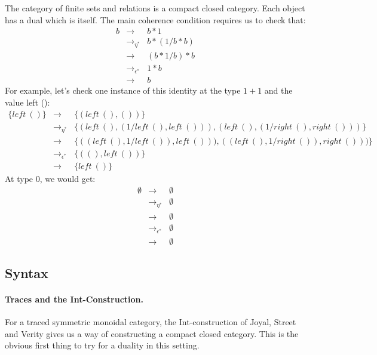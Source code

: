 \documentclass[preprint]{sigplanconf}
\begin{document}
The category of finite sets and relations is a compact closed category. Each
object has a dual which is itself. The main coherence condition requires us
to check that:
\[\begin{array}{rcl}
b &\rightarrow& b * 1 \\
  &\rightarrow_{\eta^*}& b * (1/b * b) \\
  &\rightarrow& (b * 1/b) * b \\
  &\rightarrow_{\epsilon^*}& 1 * b \\
  &\rightarrow& b
\end{array}\]
For example, let's check one instance of this identity at the type $1+1$ and
the value {{left ()}}:
\[\begin{array}{rcl}
\{ \mathit{left}~() \} &\rightarrow& \{ (\mathit{left}~(), ()) \} \\
  &\rightarrow_{\eta^*}& \{ (\mathit{left}~(),(1/\mathit{left}~(),\mathit{left}~())), 
                            (\mathit{left}~(),(1/\mathit{right}~(),\mathit{right}~())) \} \\
  &\rightarrow& \{ ((\mathit{left}~(),1/\mathit{left}~()),\mathit{left}~())), 
                   ((\mathit{left}~(),1/\mathit{right}~()),\mathit{right}~())) \} \\
  &\rightarrow_{\epsilon^*}& \{ ((),\mathit{left}~()) \} \\
  &\rightarrow& \{ \mathit{left}~() \} 
\end{array}\]
At type $0$, we would get:
\[\begin{array}{rcl}
\emptyset &\rightarrow& \emptyset \\
  &\rightarrow_{\eta^*}& \emptyset \\
  &\rightarrow& \emptyset \\
  &\rightarrow_{\epsilon^*}& \emptyset \\
  &\rightarrow& \emptyset
\end{array}\]

\subsection{Syntax} 

%


\paragraph*{Traces and the Int-Construction.}
For a traced symmetric monoidal category, the Int-construction of
Joyal, Street and Verity \cite{joyal1996traced} gives us a way of
constructing a compact closed category. This is the obvious first
thing to try for a duality in this setting.
\end{document}
